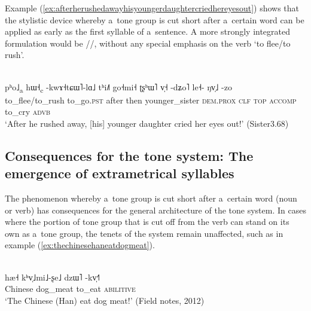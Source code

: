 Example (\ref{ex:afterherushedawayhisyoungerdaughtercriedhereyesout}) shows that the stylistic device whereby a~tone group is cut short after a~certain word can be applied as early as the first syllable of a~sentence. A more strongly integrated formulation would be //, without any special
emphasis on the verb ‘to flee/to rush’.

\begin{exe}
	\ex
	\label{ex:afterherushedawayhisyoungerdaughtercriedhereyesout}
	\\
	\gll pʰo˩\textsubscript{a}		hɯ˧\textsubscript{c}		-kwɤ˧tɕɯ˥-lɑ˩		tʰi˩˥ go˧mi˧	ʈʂʰɯ˥	v̩˧	-dʑo˥	le˧-	ŋv̩˩	-zo\\
	to\_flee/to\_rush	to\_go.\textsc{pst}	after		then younger\_sister
	\textsc{dem}.\textsc{prox}
	\textsc{clf}	\textsc{top}	\textsc{accomp}	to\_cry	\textsc{advb}\\
	\glt ‘After he rushed away, [his] younger daughter cried her eyes out!’ (Sister3.68)
\end{exe}


\subsection[The emergence of extrametrical syllables]{Consequences for the tone system: The emergence of extrametrical syllables}
\label{sec:consequencesforthetonesystemtheemergenceofextrametricalsyllables}

The phenomenon whereby a~tone group is cut short after a~certain word (noun or verb) has consequences for the general architecture of the tone system. In cases where the portion of tone
group that is cut off from the verb can stand on its own as a~tone group, the tenets of the system
remain unaffected, such as in example (\ref{ex:thechinesehaneatdogmeat}).

\begin{exe}
  \ex
  \label{ex:thechinesehaneatdogmeat}
  \\
  \gll hæ˧		kʰv̩˩mi˩-ʂe˩	dzɯ˥		-kv̩˧˥\\
  Chinese	dog\_meat	to\_eat		\textsc{abilitive}\\
  \glt ‘The Chinese (Han) eat dog meat!’ (Field notes, 2012)
\end{exe}

